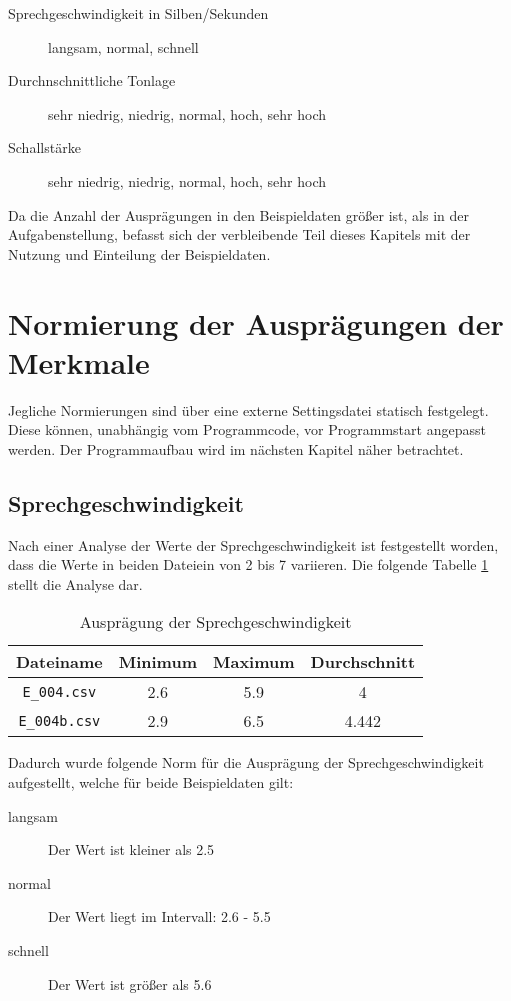 \begin{description}
  \item [Sprechgeschwindigkeit in Silben/Sekunden] langsam, normal, schnell
  \item [Durchnschnittliche Tonlage] sehr niedrig, niedrig, normal, hoch, sehr hoch
  \item [Schallstärke] sehr niedrig, niedrig, normal, hoch, sehr hoch
\end{description}

Da die Anzahl der Ausprägungen in den Beispieldaten größer ist, als in der Aufgabenstellung, befasst sich der verbleibende Teil dieses Kapitels mit der Nutzung und Einteilung der Beispieldaten.

\section{Normierung der Ausprägungen der Merkmale}
Jegliche Normierungen sind über eine externe Settingsdatei statisch festgelegt. Diese können, unabhängig vom Programmcode, vor Programmstart angepasst werden. Der Programmaufbau wird im nächsten Kapitel näher betrachtet.

\subsection{Sprechgeschwindigkeit}
Nach einer Analyse der Werte der Sprechgeschwindigkeit ist festgestellt worden, dass die Werte in beiden Dateiein von 2 bis 7 variieren. Die folgende Tabelle \ref{tab:sprechgeschwdingikeit} stellt die Analyse dar. 

\begin{table}[h]
\begin{tabular}{ c | c | c | c}
  Dateiname & Minimum & Maximum & Durchschnitt \\
  \hline 
  \verb|E_004.csv|  & 2.6 & 5.9 & 4 \\
  \verb|E_004b.csv| & 2.9 & 6.5 & 4.442 \\
\end{tabular}
\caption{Ausprägung der Sprechgeschwindigkeit}
\label{tab:sprechgeschwdingikeit}
\end{table}

Dadurch wurde folgende Norm für die Ausprägung der Sprechgeschwindigkeit aufgestellt, welche für beide Beispieldaten gilt:
\begin{description}
  \item [langsam] Der Wert ist kleiner als 2.5
  \item [normal] Der Wert liegt im Intervall: 2.6 - 5.5
  \item [schnell] Der Wert ist größer als 5.6
\end{description}

